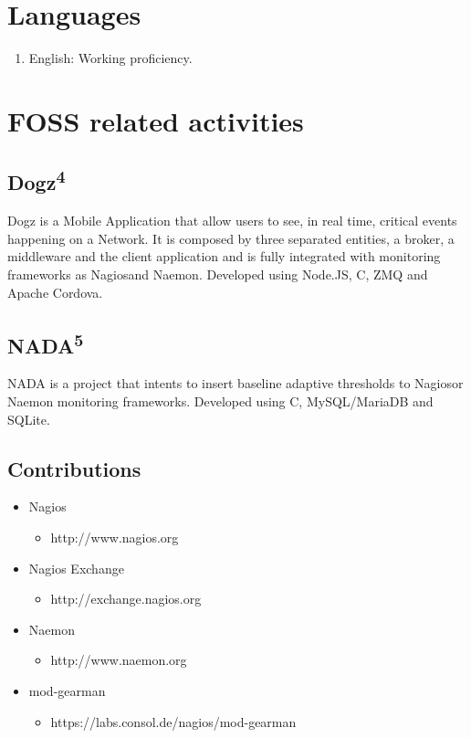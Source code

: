 \documentclass{article}
\begin{document}
\begin{multicols}{2}
\section{Languages}
\begin{enumerate}
\item English: Working proficiency.
\end{enumerate}

\section{FOSS related activities}

\subsection{Dogz\textsuperscript{4}}
Dogz is a Mobile Application that allow users to see, in real time,
critical events happening on a Network. It is composed by three separated entities, a
broker, a middleware and the client application and is fully integrated with
monitoring frameworks as Nagios\texttrademark and Naemon. Developed using
Node.JS, C, ZMQ and Apache Cordova.

\subsection{NADA\textsuperscript{5}}
NADA is a project that intents to insert baseline adaptive thresholds to 
Nagios\texttrademark or Naemon monitoring frameworks. Developed using C,
MySQL/MariaDB and SQLite.

\subsection{Contributions}
\begin{itemize}
	\item Nagios
		\begin{itemize}
			\item http://www.nagios.org
		\end{itemize}
	\item Nagios Exchange
		\begin{itemize}
			\item http://exchange.nagios.org
		\end{itemize}
	\item Naemon
		\begin{itemize}
			\item http://www.naemon.org
		\end{itemize}
	\item mod-gearman
		\begin{itemize}
			\item https://labs.consol.de/nagios/mod-gearman
		\end{itemize}
\end{itemize}


\end{multicols}
\end{document}
